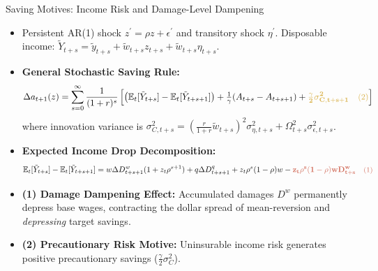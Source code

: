 \documentclass[aspectratio=169, 10pt]{beamer}
\begin{document}
\begin{frame}{Saving Motives: Income Risk and Damage-Level Dampening \hfill \hyperlink{backup:uncertainty_var}{\scriptsize{}}}\label{main:saving_risk}
    \begin{itemize}\footnotesize\setlength{\itemsep}{2pt}
        \item Persistent AR(1) shock $z^\prime = \rho z + \epsilon^\prime$ and transitory shock $\eta^\prime$. Disposable income: $\tilde{Y}_{t+s} = \tilde{y}_{t+s} + \tilde{w}_{t+s} z_{t+s} + \tilde{w}_{t+s}\eta_{t+s}$.
        \item \textbf{General Stochastic Saving Rule:}
        \begin{equation}
        \Delta a_{t+1}(z) = \sum_{s=0}^{\infty} \frac{1}{(1+r)^s} \left[ \left(\mathbb{E}_t[\tilde{Y}_{t+s}] - \mathbb{E}_t[\tilde{Y}_{t+s+1}]\right) + \tfrac{1}{\gamma} (A_{t+s} - A_{t+s+1}) + \textcolor{mutedgold}{\mathbf{\tfrac{\gamma}{2} \sigma_{C, t+s+1}^2 \quad \text{\small (2)}}} \right]
        \label{eq:saving_stoch}
        \end{equation}
        where innovation variance is $\sigma_{C, t+s}^2 = \left( \tfrac{r}{1+r} \tilde{w}_{t+s} \right)^2 \sigma_{\eta, t+s}^2 + \Omega_{t+s}^2 \sigma_{\epsilon, t+s}^2$.
        \item \textbf{Expected Income Drop Decomposition:}
        \begin{equation}
        \mathbb{E}_t[\tilde{Y}_{t+s}] - \mathbb{E}_t[\tilde{Y}_{t+s+1}] = w \Delta D^w_{t+s+1} (1 + z_t \rho^{s+1}) + q \Delta D^q_{t+s+1} + z_t \rho^s (1 - \rho) w - \textcolor{terracotta}{\mathbf{z_t \rho^s (1 - \rho) w D^w_{t+s} \quad \text{\small (1)}}}
        \label{eq:income_drop}
        \end{equation}
    \end{itemize}
    \vspace{0.04cm}
    \begin{tcolorbox}[takeawaybox, title=Two Competing Income Risk Motives]
        \footnotesize
        \begin{itemize}\setlength{\itemsep}{1pt}
            \item \textcolor{terracotta}{\textbf{(1) Damage Dampening Effect:}} Accumulated damages $D^w$ permanently depress base wages, contracting the dollar spread of mean-reversion and \textit{depressing} target savings.
            \item \textcolor{mutedgold}{\textbf{(2) Precautionary Risk Motive:}} Uninsurable income risk generates positive precautionary savings  ($\frac{\gamma}{2} \sigma_C^2$).
        \end{itemize}
    \end{tcolorbox}
\end{frame}
\end{document}
